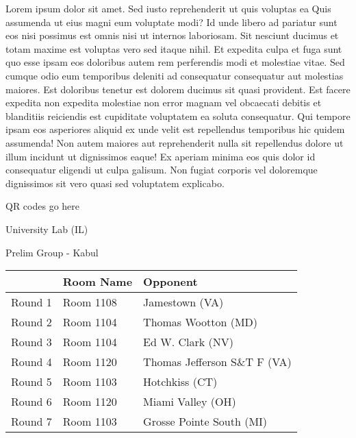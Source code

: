 \documentclass{article}%
\begin{document}
\vspace*{8pt}%
\linebreak%
\newline%
\newline%
Lorem ipsum dolor sit amet. Sed iusto reprehenderit ut quis voluptas ea Quis assumenda ut eius magni eum voluptate modi? Id unde libero ad pariatur sunt eos nisi possimus est omnis nisi ut internos laboriosam. Sit nesciunt ducimus et totam maxime est voluptas vero sed itaque nihil. Et expedita culpa et fuga sunt quo esse ipsam eos doloribus autem rem perferendis modi et molestiae vitae.\newline%
\newline%
Sed cumque odio eum temporibus deleniti ad consequatur consequatur aut molestias maiores. Est doloribus tenetur est dolorem ducimus sit quasi provident. Est facere expedita non expedita molestiae non error magnam vel obcaecati debitis et blanditiis reiciendis est cupiditate voluptatem ea soluta consequatur. Qui tempore ipsam eos asperiores aliquid ex unde velit est repellendus temporibus hic quidem assumenda!\newline%
\newline%
Non autem maiores aut reprehenderit nulla sit repellendus dolore ut illum incidunt ut dignissimos eaque! Ex aperiam minima eos quis dolor id consequatur eligendi ut culpa galisum. Non fugiat corporis vel doloremque dignissimos sit vero quasi sed voluptatem explicabo.\newline%
\newline%
%
\vspace*{30pt}%
\begin{center}%
\begin{Huge}%
QR codes go here%
\end{Huge}%
\end{center}%
\newpage%
%
\begin{center}%
\begin{Huge}%
University Lab (IL)%
\end{Huge}%
\vspace*{8pt}%
\linebreak%
\begin{Large}%
Prelim Group {-} Kabul%
\end{Large}%
\end{center}%
\begin{tabularx}{\textwidth}{|c|Y|Y|}%
\hline%
&Room Name&Opponent\\%
\hline%
Round 1&Room 1108&Jamestown (VA)\\%
Round 2&Room 1104&Thomas Wootton (MD)\\%
Round 3&Room 1104&Ed W. Clark (NV)\\%
Round 4&Room 1120&Thomas Jefferson S\&T F (VA)\\%
Round 5&Room 1103&Hotchkiss (CT)\\%
Round 6&Room 1120&Miami Valley (OH)\\%
Round 7&Room 1103&Grosse Pointe South (MI)\\%
\hline%
\end{tabularx}%
\end{document}
